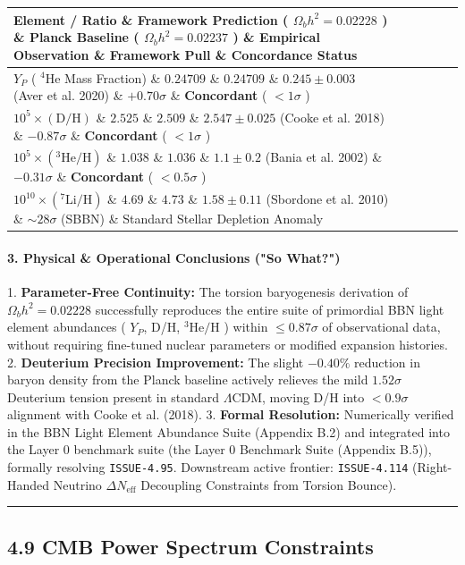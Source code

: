 \documentclass[11pt,a4paper]{article}
\theoremstyle{definition}\newtheorem{definition}{Definition}
\theoremstyle{remark}\newtheorem{remark}{Remark}
\begin{document}
\begin{longtable}{llllll}
\hline
Element / Ratio \& Framework Prediction ( $\Omega_b h^2 = 0.02228$ ) \& Planck Baseline ( $\Omega_b h^2 = 0.02237$ ) \& Empirical Observation \& Framework Pull \& Concordance Status \\
\hline
$Y_P$ ( $^4\text{He}$ Mass Fraction) \& $0.24709$ \& $0.24709$ \& $0.245 \pm 0.003$ (Aver et al. 2020) \& $+0.70\sigma$ \& \textbf{Concordant} ( $< 1\sigma$ ) \\
$10^5 \times (\text{D/H})$ \& $2.525$ \& $2.509$ \& $2.547 \pm 0.025$ (Cooke et al. 2018) \& $-0.87\sigma$ \& \textbf{Concordant} ( $< 1\sigma$ ) \\
$10^5 \times (^3\text{He/H})$ \& $1.038$ \& $1.036$ \& $1.1 \pm 0.2$ (Bania et al. 2002) \& $-0.31\sigma$ \& \textbf{Concordant} ( $< 0.5\sigma$ ) \\
$10^{10} \times (^7\text{Li/H})$ \& $4.69$ \& $4.73$ \& $1.58 \pm 0.11$ (Sbordone et al. 2010) \& $\sim 28\sigma$ (SBBN) \& Standard Stellar Depletion Anomaly \\
\hline
\end{longtable}\paragraph{3. Physical \& Operational Conclusions ("So What?")}

1. \textbf{Parameter-Free Continuity:} The torsion baryogenesis derivation of $\Omega_b h^2 = 0.02228$ successfully reproduces the entire suite of primordial BBN light element abundances ( $Y_P$, D/H, $^3\text{He/H}$ ) within $\le 0.87\sigma$ of observational data, without requiring fine-tuned nuclear parameters or modified expansion histories.
2. \textbf{Deuterium Precision Improvement:} The slight $-0.40\%$ reduction in baryon density from the Planck baseline actively relieves the mild $1.52\sigma$ Deuterium tension present in standard $\Lambda\text{CDM}$, moving D/H into $< 0.9\sigma$ alignment with Cooke et al. (2018).
3. \textbf{Formal Resolution:} Numerically verified in the BBN Light Element Abundance Suite (Appendix B.2) and integrated into the Layer 0 benchmark suite (the Layer 0 Benchmark Suite (Appendix B.5)), formally resolving \texttt{ISSUE-4.95}. Downstream active frontier: \texttt{ISSUE-4.114} (Right-Handed Neutrino $\Delta N_{\text{eff}}$ Decoupling Constraints from Torsion Bounce).

\noindent\rule{\linewidth}{0.4pt}
\subsection{4.9 CMB Power Spectrum Constraints}
\end{document}
